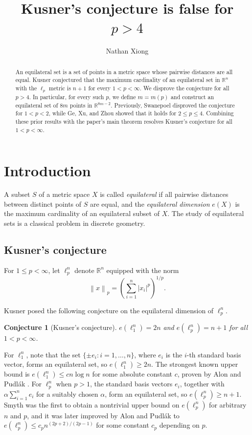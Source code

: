 \documentclass[11pt,reqno]{amsart}
\title{Kusner's conjecture is false for $p>4$}
\author{Nathan Xiong}
\theoremstyle{plain}
\newtheorem{conjecture}[theorem]{Conjecture}
\theoremstyle{definition}
\theoremstyle{remark}
\newcommand{\R}{\mathbb{R}}
\newcommand{\norm}[1]{\left\lVert #1 \right\rVert}
\numberwithin{equation}{section}
\begin{document}
\begin{abstract}
An equilateral set is a set of points in a metric space whose pairwise distances are all equal. Kusner conjectured that the maximum cardinality of an equilateral set in $\R^n$ with the $\ell_p$ metric is $n+1$ for every $1<p<\infty$. We disprove the conjecture for all $p>4$. In particular, for every such $p$, we define $m=m(p)$ and construct an equilateral set of $8m$ points in $\R^{8m-2}$. Previously, Swanepoel disproved the conjecture for $1<p<2$, while Ge, Xu, and Zhou showed that it holds for $2\le p\le 4$. Combining these prior results with the paper's main theorem resolves Kusner's conjecture for all $1<p<\infty$. 
\end{abstract}

\maketitle

\section{Introduction}\label{sec:intro}

A subset $S$ of a metric space $X$ is called \emph{equilateral} if all pairwise distances between distinct points of $S$ are equal, and the \emph{equilateral dimension} $e(X)$ is the maximum cardinality of an equilateral subset of $X$. The study of equilateral sets is a classical problem in discrete geometry.

\subsection{Kusner's conjecture}
For $1\le p<\infty$, let $\ell_p^n$ denote $\R^n$ equipped with the norm
\[\norm{x}_p=\left(\sum_{i=1}^{n}|x_i|^p\right)^{1/p}.\]

Kusner \cite{Guy} posed the following conjecture on the equilateral dimension of $\ell_p^n$.
\begin{conjecture}[Kusner's conjecture]\label{conj:kusner}
    $e(\ell_1^n)=2n$ and $e(\ell_p^n)=n+1$ for all $1<p<\infty$. 
\end{conjecture}
For $\ell_1^n$, note that the set $\{\pm e_i\colon i=1,\ldots,n\}$, where $e_i$ is the $i$-th standard basis vector, forms an equilateral set, so $e(\ell_1^n)\ge 2n$. The strongest known upper bound is $e(\ell_1^n)\le cn\log n$ for some absolute constant $c$, proven by Alon and Pudl\'ak \cite{AP03}. For $\ell_p^n$ when $p>1$, the standard basis vectors $e_i$, together with $\alpha\sum_{i=1}^{n}e_i$ for a suitably chosen $\alpha$, form an equilateral set, so $e(\ell_p^n)\ge n+1$. Smyth \cite{smyth1} was the first to obtain a nontrivial upper bound on $e(\ell_p^n)$ for arbitrary $n$ and $p$, and it was later improved by Alon and Pudl\'ak \cite{AP03} to $e(\ell_p^n)\le c_p n^{(2p+2)/(2p-1)}$ for some constant $c_p$ depending on $p$.
\end{document}
